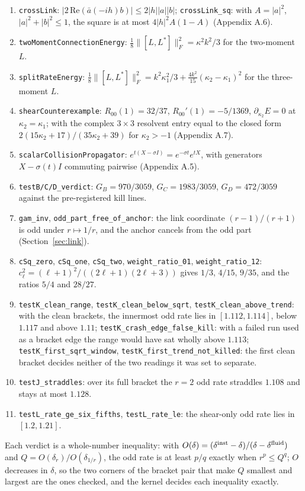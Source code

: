 \documentclass[11pt]{article}
\begin{document}
\begin{enumerate}
\item \texttt{crossLink}: $|2\,\mathrm{Re}(\bar a(-ih)b)|\le2|h||a||b|$; \texttt{crossLink\_sq}: with $A=|a|^2$, $|a|^2+|b|^2\le1$, the square is at most $4|h|^2A(1-A)$ (Appendix A.6).
\item \texttt{twoMomentConnectionEnergy}: $\tfrac18\lVert[L,L^\ast]\rVert_F^2=\kappa^2k^2/3$ for the two-moment $L$.
\item \texttt{splitRateEnergy}: $\tfrac18\lVert[L,L^\ast]\rVert_F^2=k^2\kappa_1^2/3+\tfrac{4k^2}{15}(\kappa_2-\kappa_1)^2$ for the three-moment $L$.
\item \texttt{shearCounterexample}: $R_{00}(1)=32/37$, $R_{00}'(1)=-5/1369$, $\partial_{\kappa_2}E=0$ at $\kappa_2=\kappa_1$; with the complex $3\times3$ resolvent entry equal to the closed form $2(15\kappa_2+17)/(35\kappa_2+39)$ for $\kappa_2>-1$ (Appendix A.7).
\item \texttt{scalarCollisionPropagator}: $e^{t(X-\sigma I)}=e^{-\sigma t}e^{tX}$, with generators $X-\sigma(t)I$ commuting pairwise (Appendix A.5).
\item \texttt{testB/C/D\_verdict}: $G_B=970/3059$, $G_C=1983/3059$, $G_D=472/3059$ against the pre-registered kill lines.
\item \texttt{gam\_inv}, \texttt{odd\_part\_free\_of\_anchor}: the link coordinate $(r-1)/(r+1)$ is odd under $r\mapsto1/r$, and the anchor cancels from the odd part (Section~\ref{sec:link}).
\item \texttt{cSq\_zero}, \texttt{cSq\_one}, \texttt{cSq\_two}, \texttt{weight\_ratio\_01}, \texttt{weight\_ratio\_12}: $c_\ell^2=(\ell+1)^2/((2\ell+1)(2\ell+3))$ gives $1/3$, $4/15$, $9/35$, and the ratios $5/4$ and $28/27$.
\item \texttt{testK\_clean\_range}, \texttt{testK\_clean\_below\_sqrt}, \texttt{testK\_clean\_above\_trend}: with the clean brackets, the innermost odd rate lies in $[1.112,1.114]$, below $1.117$ and above $1.11$; \texttt{testK\_crash\_edge\_false\_kill}: with a failed run used as a bracket edge the range would have sat wholly above $1.113$; \texttt{testK\_first\_sqrt\_window}, \texttt{testK\_first\_trend\_not\_killed}: the first clean bracket decides neither of the two readings it was set to separate.
\item \texttt{testJ\_straddles}: over its full bracket the $r=2$ odd rate straddles $1.108$ and stays at most $1.128$.
\item \texttt{testL\_rate\_ge\_six\_fifths}, \texttt{testL\_rate\_le}: the shear-only odd rate lies in $[1.2,1.21]$.
\end{enumerate}
Each verdict is a whole-number inequality: with $O(\delta)=(\delta^{\rm inst}-\delta)/(\delta-\delta^{\rm fluid})$ and $Q=O(\delta_r)/O(\delta_{1/r})$, the odd rate is at least $p/q$ exactly when $r^p\le Q^q$; $O$ decreases in $\delta$, so the two corners of the bracket pair that make $Q$ smallest and largest are the ones checked, and the kernel decides each inequality exactly.
\end{document}
